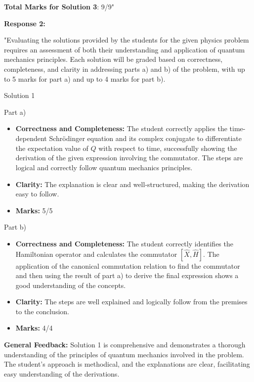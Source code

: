 \documentclass[a4paper,11pt]{article}
\begin{document}
\textbf{Total Marks for Solution 3}: 9/9"

\textbf{Response 2:}

"Evaluating the solutions provided by the students for the given physics problem requires an assessment of both their understanding and application of quantum mechanics principles. Each solution will be graded based on correctness, completeness, and clarity in addressing parts a) and b) of the problem, with up to 5 marks for part a) and up to 4 marks for part b).

Solution 1

Part a)

\begin{itemize}
    \item \textbf{Correctness and Completeness:} The student correctly applies the time-dependent Schrödinger equation and its complex conjugate to differentiate the expectation value of \( \hat{Q} \) with respect to time, successfully showing the derivation of the given expression involving the commutator. The steps are logical and correctly follow quantum mechanics principles.
    \item \textbf{Clarity:} The explanation is clear and well-structured, making the derivation easy to follow.
    \item \textbf{Marks:} 5/5
\end{itemize}

Part b)

\begin{itemize}
    \item \textbf{Correctness and Completeness:} The student correctly identifies the Hamiltonian operator and calculates the commutator \( \left[ \hat{X}, \hat{H}\right] \). The application of the canonical commutation relation to find the commutator and then using the result of part a) to derive the final expression shows a good understanding of the concepts.
    \item \textbf{Clarity:} The steps are well explained and logically follow from the premises to the conclusion.
    \item \textbf{Marks:} 4/4
\end{itemize}

\textbf{General Feedback:} Solution 1 is comprehensive and demonstrates a thorough understanding of the principles of quantum mechanics involved in the problem. The student’s approach is methodical, and the explanations are clear, facilitating easy understanding of the derivations.
\end{document}
